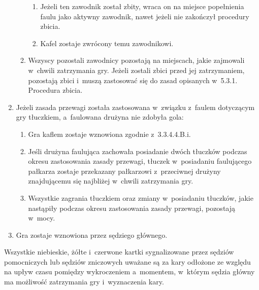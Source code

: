 \documentclass[12pt,a4paper]{article}
\renewcommand{\subsubsection}[1]{
  \oldsubsubsection{#1}%
  \leftskip1.5cm
}
\begin{document}
\begin{enumerate}
\begin{enumerate}
		            \begin{enumerate}
			            \item
			                  Jeżeli ten zawodnik został zbity, wraca on na miejsce popełnienia
			                  faulu jako aktywny zawodnik, nawet jeżeli nie zakończył
			                  procedury zbicia.
			            \item
			                  Kafel zostaje zwrócony temu zawodnikowi.
		            \end{enumerate}
		      \item
		            Wszyscy pozostali zawodnicy pozostają na miejscach, jakie zajmowali
		            w~chwili zatrzymania gry. Jeżeli zostali zbici przed jej
		            zatrzymaniem, pozostają zbici i~muszą zastosować się do zasad
		            opisanych w~5.3.1. Procedura zbicia.
	      \end{enumerate}
	\item
	      Jeżeli zasada przewagi została zastosowana w~związku z~faulem
	      dotyczącym gry tłuczkiem, a~faulowana drużyna nie zdobyła gola:

	      \begin{enumerate}
		      \item
		            Gra kaflem zostaje wznowiona zgodnie z~3.3.4.4.B.i.
		      \item
		            Jeśli drużyna faulująca zachowała posiadanie dwóch tłuczków podczas
		            okresu zastosowania zasady przewagi, tłuczek w~posiadaniu
		            faulującego pałkarza zostaje przekazany pałkarzowi z~przeciwnej
		            drużyny znajdującemu się najbliżej w~chwili zatrzymania gry.
		      \item
				Wszystkie zagrania tłuczkiem oraz zmiany w~posiadaniu tłuczków, jakie nastąpiły
				podczas okresu zastosowania zasady przewagi, pozostają w~mocy.
	      \end{enumerate}
	\item
	      Gra zostaje wznowiona przez sędziego głównego.
\end{enumerate}

\subsubsection{Odłożone kary}

Wszystkie niebieskie, żółte i~czerwone kartki sygnalizowane przez
sędziów pomocniczych lub sędziów zniczowych uważane są za kary odłożone
ze względu na upływ czasu pomiędzy wykroczeniem a~momentem, w~którym
sędzia główny ma możliwość zatrzymania gry i~wyznaczenia kary.
\end{document}
